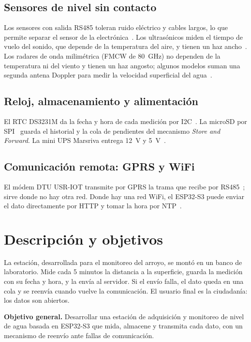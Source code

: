 \documentclass[11pt,a4paper]{article}
\newcommand{\seccion}[1]{\needspace{10\baselineskip}\section{#1}}
\begin{document}
\subsection{Sensores de nivel sin contacto}
Los sensores con salida RS485 toleran ruido eléctrico y cables largos, lo que
permite separar el sensor de la electrónica~\cite{modbus}. Los
ultrasónicos miden el tiempo de vuelo del sonido, que depende de la
temperatura del aire, y tienen un haz ancho~\cite{ultrasonico}. Los
radares de onda milimétrica (FMCW de 80~GHz) no dependen de la
temperatura ni del viento y tienen un haz angosto; algunos modelos suman una
segunda antena Doppler para medir la velocidad superficial del
agua~\cite{fm02b_ficha}.

\subsection{Reloj, almacenamiento y alimentación}
El RTC DS3231M da la fecha y hora de cada medición por I2C~\cite{ds3231}. La
microSD por SPI~\cite{microsd} guarda el historial y la cola de pendientes del
mecanismo \emph{Store and Forward}. La mini UPS Marsriva entrega 12~V y
5~V~\cite{ups}.

\subsection{Comunicación remota: GPRS y WiFi}
El módem DTU USR-IOT transmite por GPRS la trama que recibe por
RS485~\cite{dtu}; sirve donde no hay otra red. Donde hay una red WiFi, el
ESP32-S3 puede enviar el dato directamente por HTTP y tomar la hora por
NTP~\cite{espidf}.

\seccion{Descripción y objetivos}
\label{sec:objetivos}

La estación, desarrollada para el monitoreo del arroyo, se montó en un banco de
laboratorio. Mide cada 5 minutos la distancia a la superficie, guarda la
medición con su fecha y hora, y la envía al servidor. Si el envío falla, el dato
queda en una cola y se reenvía cuando vuelve la comunicación. El usuario final
es la ciudadanía: los datos son abiertos.

\textbf{Objetivo general.} Desarrollar una estación de adquisición y monitoreo
de nivel de agua basada en ESP32-S3 que mida, almacene y transmita cada dato,
con un mecanismo de reenvío ante fallas de comunicación.
\end{document}
